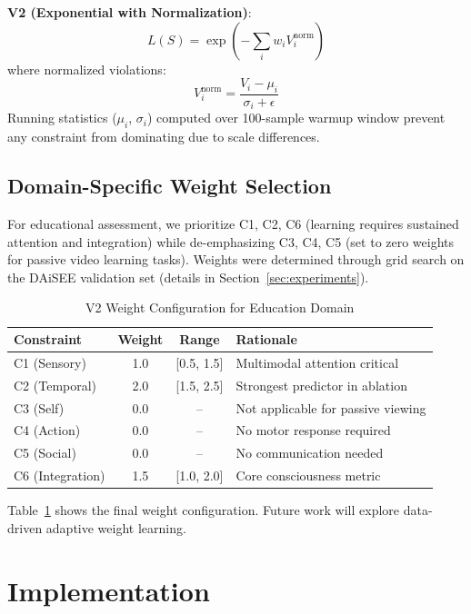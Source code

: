 \documentclass[10pt,journal,compsoc]{IEEEtran}
\begin{document}
\textbf{V2 (Exponential with Normalization)}:
\begin{equation}
L(S) = \exp\left(-\sum_i w_i V_i^{\text{norm}}\right)
\end{equation}
where normalized violations:
\begin{equation}
V_i^{\text{norm}} = \frac{V_i - \mu_i}{\sigma_i + \epsilon}
\end{equation}
Running statistics ($\mu_i$, $\sigma_i$) computed over 100-sample warmup window prevent any constraint from dominating due to scale differences.

\subsection{Domain-Specific Weight Selection}

For educational assessment, we prioritize C1, C2, C6 (learning requires sustained attention and integration) while de-emphasizing C3, C4, C5 (set to zero weights for passive video learning tasks). Weights were determined through grid search on the DAiSEE validation set (details in Section~\ref{sec:experiments}).

\begin{table}[!t]
\renewcommand{\arraystretch}{1.3}
\caption{V2 Weight Configuration for Education Domain}
\label{tab:weights}
\centering
\begin{tabular}{lccp{1.5in}}
\toprule
\textbf{Constraint} & \textbf{Weight} & \textbf{Range} & \textbf{Rationale} \\
\midrule
C1 (Sensory) & 1.0 & [0.5, 1.5] & Multimodal attention critical \\
C2 (Temporal) & 2.0 & [1.5, 2.5] & Strongest predictor in ablation \\
C3 (Self) & 0.0 & -- & Not applicable for passive viewing \\
C4 (Action) & 0.0 & -- & No motor response required \\
C5 (Social) & 0.0 & -- & No communication needed \\
C6 (Integration) & 1.5 & [1.0, 2.0] & Core consciousness metric \\
\bottomrule
\end{tabular}
\end{table}

Table~\ref{tab:weights} shows the final weight configuration. Future work will explore data-driven adaptive weight learning.

\section{Implementation}
\label{sec:implementation}
\end{document}
